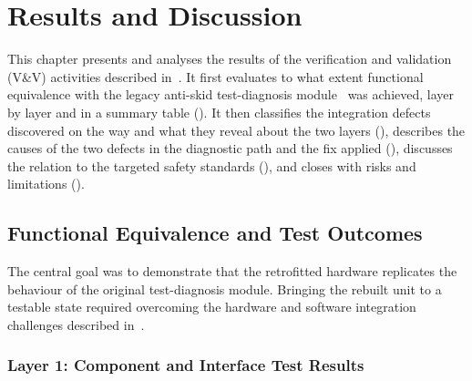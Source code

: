 \chapter{Results and Discussion}
\label{chap:results}
\raggedbottom

This chapter presents and analyses the results of the verification and validation (V\&V) activities described in~. It first evaluates to what extent functional equivalence with the legacy anti-skid test-diagnosis module~\cite{rexroth1992wsp} was achieved, layer by layer and in a summary table (). It then classifies the integration defects discovered on the way and what they reveal about the two layers (), describes the causes of the two defects in the diagnostic path and the fix applied (), discusses the relation to the targeted safety standards (), and closes with risks and limitations ().

\section{Functional Equivalence and Test Outcomes}
\label{sec:equivalence_outcomes}

The central goal was to demonstrate that the retrofitted hardware replicates the behaviour of the original test-diagnosis module. Bringing the rebuilt unit to a testable state required overcoming the hardware and software integration challenges described in~.

\subsection{Layer 1: Component and Interface Test Results}
\label{subsec:fpga_interface_results}


